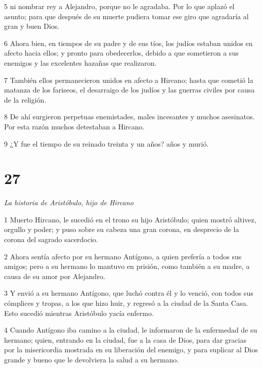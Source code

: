 \par 5 ni nombrar rey a Alejandro, porque no le agradaba. Por lo que aplazó el asunto; para que después de su muerte pudiera tomar ese giro que agradaría al gran y buen Dios.

\par 6 Ahora bien, en tiempos de su padre y de sus tíos, los judíos estaban unidos en afecto hacia ellos; y pronto para obedecerlos, debido a que sometieron a sus enemigos y las excelentes hazañas que realizaron.

\par 7 También ellos permanecieron unidos en afecto a Hircano; hasta que cometió la matanza de los fariseos, el desarraigo de los judíos y las guerras civiles por causa de la religión.

\par 8 De ahí surgieron perpetuas enemistades, males incesantes y muchos asesinatos. Por esta razón muchos detestaban a Hircano.

\par 9 ¿Y fue el tiempo de su reinado treinta y un años? años y murió.

\chapter{27}

\par \textit{La historia de Aristóbulo, hijo de Hircano}

\par 1 Muerto Hircano, le sucedió en el trono su hijo Aristóbulo; quien mostró altivez, orgullo y poder; y puso sobre su cabeza una gran corona, en desprecio de la corona del sagrado sacerdocio.

\par 2 Ahora sentía afecto por su hermano Antígono, a quien prefería a todos sus amigos; pero a su hermano lo mantuvo en prisión, como también a su madre, a causa de su amor por Alejandro.

\par 3 Y envió a su hermano Antígono, que luchó contra él y lo venció, con todos sus cómplices y tropas, a los que hizo huir, y regresó a la ciudad de la Santa Casa. Esto sucedió mientras Aristóbulo yacía enfermo.

\par 4 Cuando Antígono iba camino a la ciudad, le informaron de la enfermedad de su hermano; quien, entrando en la ciudad, fue a la casa de Dios, para dar gracias por la misericordia mostrada en su liberación del enemigo, y para suplicar al Dios grande y bueno que le devolviera la salud a su hermano.

